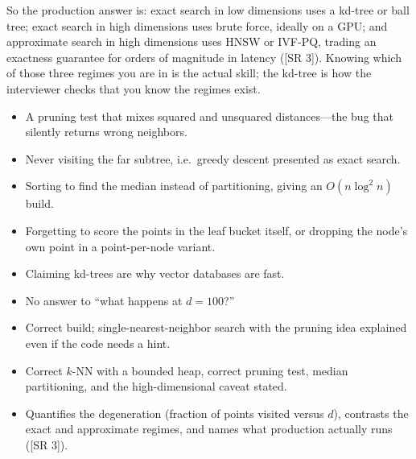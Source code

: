 \begin{interviewq}
So the production answer is: exact search in low dimensions uses a kd-tree or ball tree; exact search in high dimensions uses brute force, ideally on a GPU; and approximate search in high dimensions uses HNSW or IVF-PQ, trading an exactness guarantee for orders of magnitude in latency ([SR 3]). Knowing which of those three regimes you are in is the actual skill; the kd-tree is how the interviewer checks that you know the regimes exist.

\redflags
\begin{itemize}
    \item A pruning test that mixes squared and unsquared distances---the bug that silently returns wrong neighbors.
    \item Never visiting the far subtree, i.e.\ greedy descent presented as exact search.
    \item Sorting to find the median instead of partitioning, giving an $O(n \log^2 n)$ build.
    \item Forgetting to score the points in the leaf bucket itself, or dropping the node's own point in a point-per-node variant.
    \item Claiming kd-trees are why vector databases are fast.
    \item No answer to ``what happens at $d = 100$?''
\end{itemize}


\goodgreat
\begin{itemize}
    \item {} Correct build; single-nearest-neighbor search with the pruning idea explained even if the code needs a hint.
    \item {} Correct $k$-NN with a bounded heap, correct pruning test, median partitioning, and the high-dimensional caveat stated.
    \item {} Quantifies the degeneration (fraction of points visited versus $d$), contrasts the exact and approximate regimes, and names what production actually runs ([SR 3]).
\end{itemize}

\end{interviewq}

